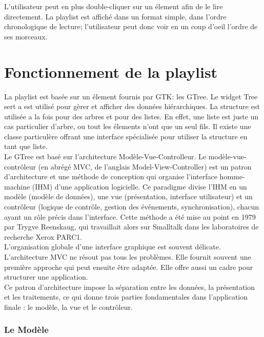 \documentclass[12pt,a4paper]{report}
\begin{document}
L'utilisateur peut en plus double-cliquer sur un élement afin de le lire directement. La playlist est affiché dans un format simple, dans l'ordre chronologique de lecture; l'utilisateur peut donc voir en un coup d'oeil l'ordre de ses morceaux.

\section{Fonctionnement de la playlist}

La playlist est basée sur un élement fournis par GTK: les GTree. Le widget Tree sert a est utilisé pour gèrer et afficher des données hiérarchiques. La structure est utilisée a la fois pour des arbres et pour des listes. En effet, une liste est juste un cas particulier d'arbre, ou tout les élements n'ont que un seul fils. Il existe une classe particulère offrant une interface spécialisée pour utiliser la structure en tant que liste.\\

Le GTree est basé sur l'architecture Modèle-Vue-Controlleur. Le modèle-vue-contrôleur (en abrégé MVC, de l'anglais Model-View-Controller) est un patron d'architecture et une méthode de conception qui organise l'interface homme-machine (IHM) d'une application logicielle. Ce paradigme divise l'IHM en un modèle (modèle de données), une vue (présentation, interface utilisateur) et un contrôleur (logique de contrôle, gestion des événements, synchronisation), chacun ayant un rôle précis dans l'interface. Cette méthode a été mise au point en 1979 par Trygve Reenskaug, qui travaillait alors sur Smalltalk dans les laboratoires de recherche Xerox PARC1.\\

L'organisation globale d'une interface graphique est souvent délicate. L'architecture MVC ne résout pas tous les problèmes. Elle fournit souvent une première approche qui peut ensuite être adaptée. Elle offre aussi un cadre pour structurer une application.\\

Ce patron d'architecture impose la séparation entre les données, la présentation et les traitements, ce qui donne trois parties fondamentales dans l'application finale : le modèle, la vue et le contrôleur. \\

\subsubsection{Le Modèle}
\end{document}
